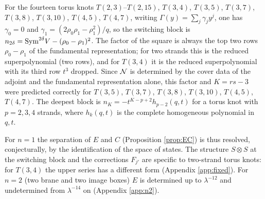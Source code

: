 \begin{result}\label{cr:rows}
For the fourteen torus knots $T(2,3)$--$T(2,15)$, $T(3,4)$, $T(3,5)$, $T(3,7)$, $T(3,8)$, $T(3,10)$, $T(4,5)$, $T(4,7)$, writing $\Gamma(y) = \sum_j\gamma_j y^j$, one has $\gamma_0 = 0$ and $\gamma_1 = (2\rho_0\rho_1 - \rho_1^2)/q$, so the switching block is $n_{2\delta} = \mathrm{Sym}^{2\delta}V - (\rho_0 - \rho_1)^2$. The factor of the square is always the top two rows $\rho_0 - \rho_1$ of the fundamental representation; for two strands this is the reduced superpolynomial (two rows), and for $T(3,4)$ it is the reduced superpolynomial with its third row $t^3$ dropped. Since $\mathcal{N}$ is determined by the cover data of the adjoint and the fundamental representation alone, this factor and $K = rs - 3$ were predicted correctly for $T(3,5)$, $T(3,7)$, $T(3,8)$, $T(3,10)$, $T(4,5)$, $T(4,7)$. The deepest block is $n_K = -t^{K-p+2}h_{p-2}(q,t)$ for a torus knot with $p = 2, 3, 4$ strands, where $h_k(q,t)$ is the complete homogeneous polynomial in $q, t$.
\end{result}
For $n = 1$ the separation of $E$ and $C$ (Proposition \ref{prop:EC}) is thus resolved, conjecturally, by the identification of the space of states. The structure $S\otimes S$ at the switching block and the corrections $F_{j'}$ are specific to two-strand torus knots: for $T(3,4)$ the upper series has a different form (Appendix \ref{app:fixed}). For $n = 2$ (two brane and two image boxes) $E$ is determined up to $\lambda^{-12}$ and undetermined from $\lambda^{-14}$ on (Appendix \ref{app:n2}).
